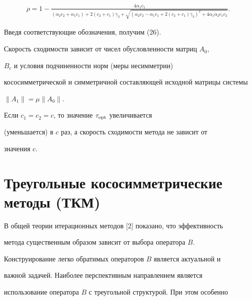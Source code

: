 \begin{pf}
\begin{gather*}
% 


\rho=1-\frac{4\alpha_1c_1} 


{(\alpha_2c_2+\alpha_1c_1)+2(c_2+c_1)\gamma_3+ 


\sqrt{(\alpha_2c_2-\alpha_1c_1+2(c_2+c_1)\gamma_3)^2+ 


4\alpha_1\alpha_2c_1c_2}}. 


\end{gather*} 


Введя соответствующие обозначения, получим (26). 


 


Скорость сходимости зависит от чисел обусловленности матриц $A_0$, 


$B_c$ и условия подчиненности норм (меры несимметрии) 


кососимметрической и симметричной составляющей исходной матрицы системы 


$\|A_1\|=\mu\|A_0\|$. 


\end{pf} 


 


\begin{notenonum} 


Если $c_1=c_2=c$, то значение $\tau_{\operatorname{opt}}$ увеличивается 


(уменьшается) в $c$ раз, а скорость сходимости метода не зависит от 


значения $c$. 


\end{notenonum} 


 


\section{Треугольные кососимметрические методы (ТКМ)} 


 


В общей теории итерационных методов [2] показано, что эффективность 


метода существенным образом зависит от выбора оператора $B$. 


Конструирование легко обратимых операторов $B$ является актуальной и 


важной задачей. Наиболее перспективным направлением является 


использование оператора $B$ с треугольной структурой. При этом особенно 


